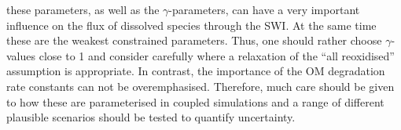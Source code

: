 \documentclass[gmd, manuscript]{copernicus}
\begin{document}
these parameters, as well as the $\gamma$-parameters, can have a very important influence on the flux of dissolved species through the SWI. At the same time these are the weakest constrained parameters. 
Thus, one should rather choose $\gamma$-values close to 1 and consider carefully where a relaxation of the 
``all reoxidised'' assumption is appropriate. In contrast, the importance of the OM degradation rate constants can not be overemphasised. Therefore, much care should be given to how 
these are parameterised in coupled simulations and a range of different plausible scenarios should be tested to quantify uncertainty. 

\end{document}
